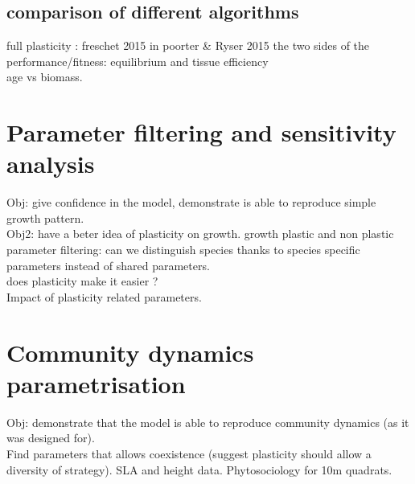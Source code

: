 \subsection{comparison of different algorithms}
full plasticity : freschet 2015 in poorter \& Ryser 2015
the two sides of the performance/fitness: equilibrium and tissue efficiency\\
age vs biomass.

\section{Parameter filtering and sensitivity analysis}
Obj: give confidence in the model, demonstrate is able to reproduce simple growth pattern.\\
Obj2: have a beter idea of plasticity on growth.
growth plastic and non plastic parameter filtering: can we distinguish species thanks to species specific parameters instead of shared parameters.\\
does plasticity make it easier ?\\
Impact of plasticity related parameters.

\section{Community dynamics parametrisation}
Obj: demonstrate that the model is able to reproduce community dynamics (as it was designed for).\\
Find parameters that allows coexistence (suggest plasticity should allow a diversity of strategy). SLA and height data. Phytosociology for 10m quadrats.
